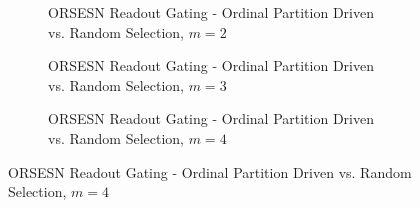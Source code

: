 \begin{figure}
    \centering

    \begin{subfigure}{\textwidth}
        \caption{ORSESN Readout Gating - Ordinal Partition Driven vs. Random Selection, $m=2$}
        \label{fig:ORSESN_routing_m_2}
        \centering
    \end{subfigure}

    \vspace{0em}

    \begin{subfigure}{\textwidth}
        \caption{ORSESN Readout Gating - Ordinal Partition Driven vs. Random Selection, $m=3$}
        \label{fig:ORSESN_routing_m_3}
        \centering
    \end{subfigure}

    \vspace{0em}

    \begin{subfigure}[t]{\textwidth}
        \caption{ORSESN Readout Gating - Ordinal Partition Driven vs. Random Selection, $m=4$}
        \label{fig:ORSESN_routing_m_4}
        \centering
    \end{subfigure}


\end{figure}
